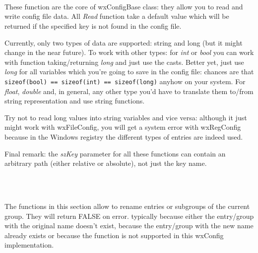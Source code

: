 
\\
\\
\\


These function are the core of wxConfigBase class: they allow you to read and
write config file data. All {\it Read} function take a default value which
will be returned if the specified key is not found in the config file.

Currently, only two types of data are supported: string and long (but it might
change in the near future). To work with other types: for {\it int} or {\it
bool} you can work with function taking/returning {\it long} and just use the
casts. Better yet, just use {\it long} for all variables which you're going to
save in the config file: chances are that \verb$sizeof(bool) == sizeof(int) == sizeof(long)$ anyhow on your system. For {\it float}, {\it double} and, in
general, any other type you'd have to translate them to/from string
representation and use string functions.

Try not to read long values into string variables and vice versa: although it
just might work with wxFileConfig, you will get a system error with
wxRegConfig because in the Windows registry the different types of entries are
indeed used.

Final remark: the {\it szKey} parameter for all these functions can contain an
arbitrary path (either relative or absolute), not just the key name.

\\
\\


The functions in this section allow to rename entries or subgroups of the
current group. They will return FALSE on error. typically because either the
entry/group with the original name doesn't exist, because the entry/group with
the new name already exists or because the function is not supported in this
wxConfig implementation.

\\

